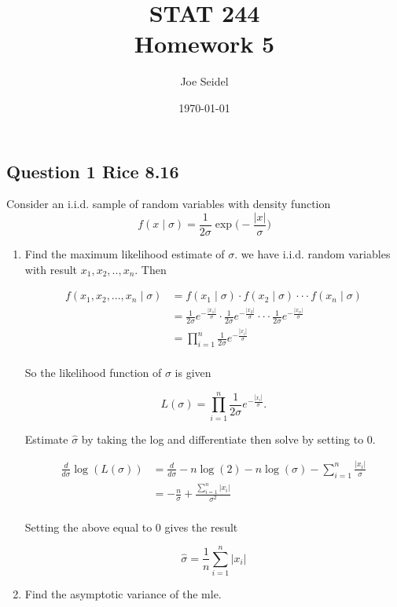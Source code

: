 \documentclass{tufte-book}
\title{STAT 244 \\ Homework 5}
\author{Joe Seidel}
\date{\today}
\theoremstyle{mytheoremstyle}
\theoremstyle{mylemstyle}
\theoremstyle{mydefstyle}
\begin{document}
\maketitle
{}
\newpage
{}

\subsection{Question 1 Rice 8.16}

Consider an i.i.d. sample of random variables with density function
\[ f(x \mid \sigma) = \frac{1}{2\sigma}\exp\Big(- \frac{|x|}{\sigma} \Big) \]

\begin{enumerate}
\item Find the maximum likelihood estimate of $\sigma$.
 we have i.i.d. random variables with result $x_1,x_2,..,x_n$.  Then

\begin{align*}
f(x_1, x_2,...,x_n\mid \sigma) &= f(x_1\mid \sigma) \cdot f(x_2\mid \sigma) \cdot \cdot \cdot f(x_n\mid \sigma)\\
&= \frac{1}{2\sigma}e^{-\frac{|x_1|}{\sigma}} \cdot \frac{1}{2\sigma}e^{-\frac{|x_2|}{\sigma}} \cdot \cdot \cdot \frac{1}{2\sigma}e^{-\frac{|x_n|}{\sigma}}\\
&= \prod_{i=1}^{n}\frac{1}{2\sigma}e^{-\frac{|x_i|}{\sigma}}\\
\end{align*}

So the likelihood function of $\sigma$ is given

\[L(\sigma) = \prod_{i=1}^{n}\frac{1}{2\sigma}e^{-\frac{|x_i|}{\sigma}}. \]

Estimate $\hat{\sigma}$ by taking the log and differentiate then solve by setting to $0$.

\begin{align*}
\frac{d}{d\sigma}\log(L(\sigma)) &= \frac{d}{d\sigma} -n\log(2)-n\log(\sigma) - \sum_{i=1}^n \frac{|x_i|}{\sigma} \\
&= -\frac{n}{\sigma} + \frac{\sum_{i=1}^n|x_i|}{\sigma^2}\\
\end{align*}

Setting the above equal to $0$ gives the result 

\[ \hat{\sigma} = \frac{1}{n} \sum_{i=1}^n |x_i| \]

\item Find the asymptotic variance of the mle.


\end{enumerate}
\end{document}
